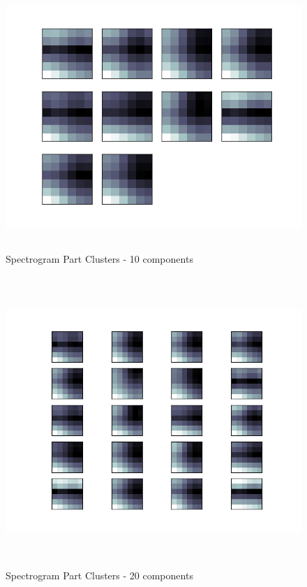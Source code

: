 \documentclass[11pt]{article}
\begin{document}
\begin{figure}[htb]
\centering
\includegraphics[height=10cm]{./spec_avg_parts_10.png}
\caption{\label{fig:spec_avg_parts_10}Spectrogram Part Clusters - 10 components}
\end{figure}

\begin{figure}[htb]
\centering
\includegraphics[height=11cm]{./spec_avg_parts_20.png}
\caption{\label{fig:spec_avg_parts_20}Spectrogram Part Clusters - 20 components}
\end{figure}
\end{document}
